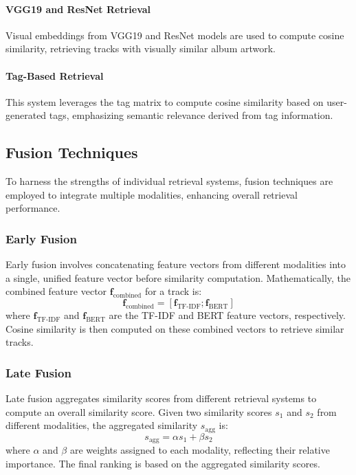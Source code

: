 \documentclass[sigconf]{acmart}
\begin{document}
\paragraph{VGG19 and ResNet Retrieval}
Visual embeddings from VGG19 and ResNet models are used to compute cosine similarity, retrieving tracks with visually similar album artwork.

\paragraph{Tag-Based Retrieval}
This system leverages the tag matrix to compute cosine similarity based on user-generated tags, emphasizing semantic relevance derived from tag information.

\subsection{Fusion Techniques}
\label{subsec:fusion_techniques}

To harness the strengths of individual retrieval systems, fusion techniques are employed to integrate multiple modalities, enhancing overall retrieval performance.

\subsubsection{Early Fusion}

Early fusion involves concatenating feature vectors from different modalities into a single, unified feature vector before similarity computation. Mathematically, the combined feature vector \( \mathbf{f}_{\text{combined}} \) for a track is:
\[
\mathbf{f}_{\text{combined}} = [\mathbf{f}_{\text{TF-IDF}}; \mathbf{f}_{\text{BERT}}]
\]
where \( \mathbf{f}_{\text{TF-IDF}} \) and \( \mathbf{f}_{\text{BERT}} \) are the TF-IDF and BERT feature vectors, respectively. Cosine similarity is then computed on these combined vectors to retrieve similar tracks.

\subsubsection{Late Fusion}

Late fusion aggregates similarity scores from different retrieval systems to compute an overall similarity score. Given two similarity scores \( s_1 \) and \( s_2 \) from different modalities, the aggregated similarity \( s_{\text{agg}} \) is:
\[
s_{\text{agg}} = \alpha s_1 + \beta s_2
\]
where \( \alpha \) and \( \beta \) are weights assigned to each modality, reflecting their relative importance. The final ranking is based on the aggregated similarity scores.
\end{document}

